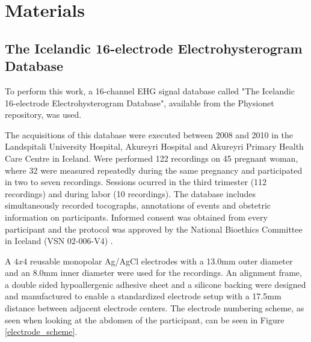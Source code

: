 \documentclass[bioengineering,article,submit,moreauthors,pdftex,10pt,a4paper]{mdpi}
\begin{document}
\section{Materials}

\subsection{The Icelandic 16-electrode Electrohysterogram Database}

To perform this work, a 16-channel EHG signal database called "The Icelandic 16-electrode Electrohysterogram Database", available from the Physionet repository, was used.

The acquisitions of this database were executed between 2008 and 2010 in the Landspitali University Hospital, Akureyri Hospital and Akureyri Primary Health Care Centre in Iceland. Were performed 122 recordings on 45 pregnant woman, where 32 were measured repeatedly during the same pregnancy and participated in two to seven recordings. Sessions ocurred in the third trimester (112 recordings) and during labor (10 recordings). The database includes simultaneously recorded tocographs, annotations of events and obstetric information on participants. Informed consent was obtained from every participant and the protocol was approved by the National Bioethics Committee in Iceland (VSN 02-006-V4) \cite{ref-islddatabase}.

A $4x4$ reusable monopolar Ag/AgCl electrodes with a 13.0mm outer diameter and an 8.0mm inner diameter were used for the recordings. An alignment frame, a double sided hypoallergenic adhesive sheet and a silicone backing were designed and manufactured to enable a standardized electrode setup with a 17.5mm distance between adjacent electrode centers. The electrode numbering scheme, as seen when looking at the abdomen of the participant, can be seen in Figure \ref{electrode_scheme}.
\end{document}
